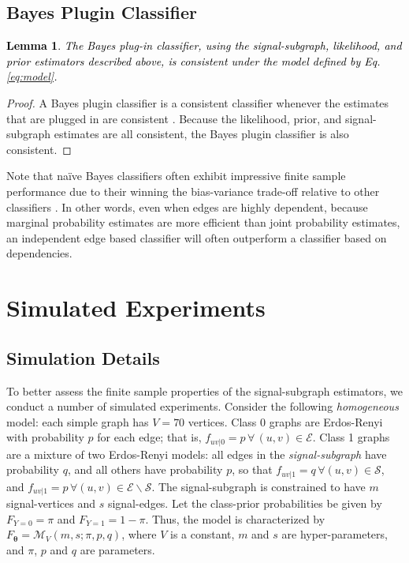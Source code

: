 \documentclass[10pt,journal,cspaper,compsoc]{IEEEtran}
\providecommand{\tk}[1]{\textcolor{black}{#1}}
\providecommand{\ve}[1]{\boldsymbol{#1}}
\newcommand{\bth}{\ve{\theta}}
\providecommand{\mc}[1]{\mathcal{#1}}
\newtheorem{Lem}{Lemma}[section]
\begin{document}
\subsection{Bayes Plugin Classifier}

\tk{\begin{Lem}
	The Bayes plug-in classifier, using the signal-subgraph, likelihood, and prior estimators described above, is consistent under the model defined by Eq. \ref{eq:model}.
\end{Lem}
}
 
\begin{proof}
A Bayes plugin classifier is a consistent classifier whenever the estimates that are plugged in are consistent \cite{Bickel2000}.  Because the likelihood, prior, and signal-subgraph estimates are all consistent, the Bayes plugin classifier is also consistent.  
\end{proof}

Note that na\"ive Bayes classifiers often exhibit impressive finite sample performance due to their winning the bias-variance trade-off relative to other classifiers \cite{Hand2001}.  In other words, even when edges are highly dependent, because marginal probability estimates are more efficient than joint probability estimates, an independent edge based classifier will often outperform a classifier based on dependencies.






\section{Simulated Experiments} %
\label{sub:subsection_name}

\subsection{Simulation Details} %
\label{sub:simulation_details}

To better assess the finite sample properties of the signal-subgraph estimators, we conduct a number of simulated experiments.  Consider the following \emph{homogeneous} model: each simple graph has $V=70$ vertices.  Class 0 graphs are Erdos-Renyi with probability $p$ for each edge; that is, $f_{uv|0}=p \, \forall \, (u,v) \in \mc{E}$.  Class 1 graphs are a mixture of two Erdos-Renyi models: all edges in the \emph{signal-subgraph} have probability $q$, and all others have probability $p$, so that $f_{uv|1}=q \, \forall (u,v) \in \mc{S}$, and $f_{uv|1}=p \, \forall (u,v) \in \mc{E} \backslash \mc{S}$.  The signal-subgraph is constrained to have $m$ signal-vertices and $s$ signal-edges.  Let the class-prior probabilities be given by $F_{Y=0}=\pi$ and $F_{Y=1}=1-\pi$. Thus, the model is characterized by $F_{\bth}=\mc{M}_V(m,s; \pi,p,q)$, where $V$ is a constant, $m$ and $s$ are hyper-parameters, and $\pi$, $p$ and $q$ are parameters.  
\end{document}
